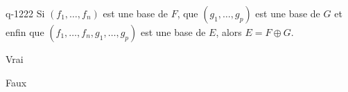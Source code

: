 \begin{truefalse}{q-1222}
Si $(f_1,\ldots,f_n)$ est une base de $F$, que $(g_1,\ldots,g_p)$ est une base de $G$ et enfin que $(f_1,\ldots,f_n,g_1,\ldots,g_p)$ est une base de $E$, alors $E=F\oplus G$.
\item* Vrai
\item Faux
\end{truefalse}

